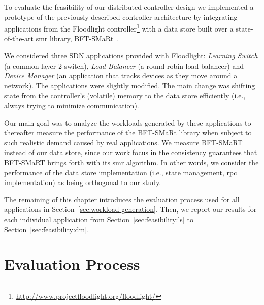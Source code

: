 \label{sec:feasibility:apps}
\glsresetall


To evaluate the feasibility of our distributed controller design we implemented a prototype of the previously described controller architecture by integrating applications from the Floodlight controller\footnote{\url{http://www.projectfloodlight.org/floodlight/}} with a data store built over a state-of-the-art \gls{smr} library, BFT-SMaRt~\cite{smart-tr}. 


We considered three SDN applications provided with Floodlight: \emph{Learning Switch}  (a common layer 2 switch), \emph{Load   Balancer} (a round-robin load balancer) and \emph{Device Manager} (an application that tracks devices as they move around a network). 
The applications were slightly modified. 
The main change was shifting state from the controller’s (volatile) memory to the data store efficiently (i.e., always trying to minimize communication).

Our main goal  was to analyze the workloads generated by these applications to thereafter measure the performance of the BFT-SMaRt library when subject to such realistic demand caused by real applications.
We measure BFT-SMaRT instead of our data store, since our work focus in the consistency guarantees that  BFT-SMaRT brings forth with its \gls{smr} algorithm. 
In other words, we consider the performance of the data store implementation (i.e., state management, \gls{rpc} implementation) as being orthogonal to our study. 

The remaining of this chapter introduces the evaluation process used for all applications in Section~\ref{sec:workload-generation}. 
Then, we report our results for each individual application from  Section~\ref{sec:feasibility:ls} to Section~\ref{sec:feasibility:dm}. 



\section{Evaluation Process}


